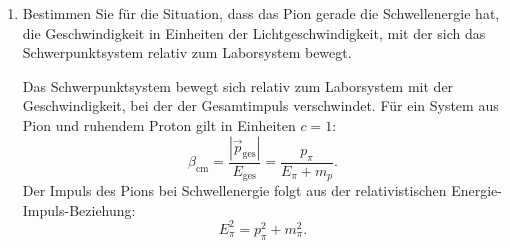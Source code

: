 \documentclass[11pt,a4paper]{scrartcl}
\newcommand{\abs}[1]{\left| #1 \right|}
\begin{document}
\begin{enumerate}[label=(\alph*)]
\begin{calculationbox}
                \begin{calculationbox}
                    Mit
                    \[
                        m_{\Delta}=\SI{1232}{MeV},
                        \qquad
                        m_p=\SI{938.3}{MeV},
                        \qquad
                        m_{\pi^-}=\SI{139.6}{MeV}
                    \]
                    folgt
                    \begin{align*}
                        E_{\pi,\mathrm{thr}}
                        &=\frac{(1232)^2-(938.3)^2-(139.6)^2}{2\cdot 938.3}\,\si{MeV}\\
                        &=\SI{329.28}{MeV}.
                    \end{align*}
                    Falls man die kinetische Energie des Pions meint, muss noch die Ruheenergie
                    des Pions abgezogen werden:
                    \begin{align*}
                        T_{\pi,\mathrm{thr}}
                        &=E_{\pi,\mathrm{thr}}-m_{\pi}\\
                        &=\SI{329.28}{MeV}-\SI{139.60}{MeV}\\
                        &=\SI{189.68}{MeV}.
                    \end{align*}
                \end{calculationbox}
            \end{calculationbox}

            \begin{answerbox}
                Die Schwellenergie als Gesamtenergie des einlaufenden Pions ist
                \[
                    \boxed{E_{\pi,\mathrm{thr}}=\SI{329.28}{MeV}.}
                \]
                Die dazugehörige kinetische Schwellenergie ist
                \[
                    \boxed{T_{\pi,\mathrm{thr}}=\SI{189.68}{MeV}.}
                \]
                Für die Rechnung im nächsten Teil verwenden wir die Gesamtenergie
                $E_{\pi,\mathrm{thr}}$.
            \end{answerbox}

        \item
            Bestimmen Sie für die Situation, dass das Pion gerade die Schwellenergie hat,
            die Geschwindigkeit in Einheiten der Lichtgeschwindigkeit, mit der sich das
            Schwerpunktsystem relativ zum Laborsystem bewegt.

            \begin{calculationbox}
                Das Schwerpunktsystem bewegt sich relativ zum Laborsystem mit der Geschwindigkeit,
                bei der der Gesamtimpuls verschwindet. Für ein System aus Pion und ruhendem Proton gilt
                in Einheiten $c=1$:
                \[
                    \beta_{\mathrm{cm}}
                    =\frac{\abs{\vec p_{\mathrm{ges}}}}{E_{\mathrm{ges}}}
                    =\frac{p_{\pi}}{E_{\pi}+m_p}.
                \]
                Der Impuls des Pions bei Schwellenergie folgt aus der relativistischen
                Energie-Impuls-Beziehung:
                \[
                    E_{\pi}^2=p_{\pi}^2+m_{\pi}^2.
                \]


\end{calculationbox}
\end{enumerate}
\end{document}
